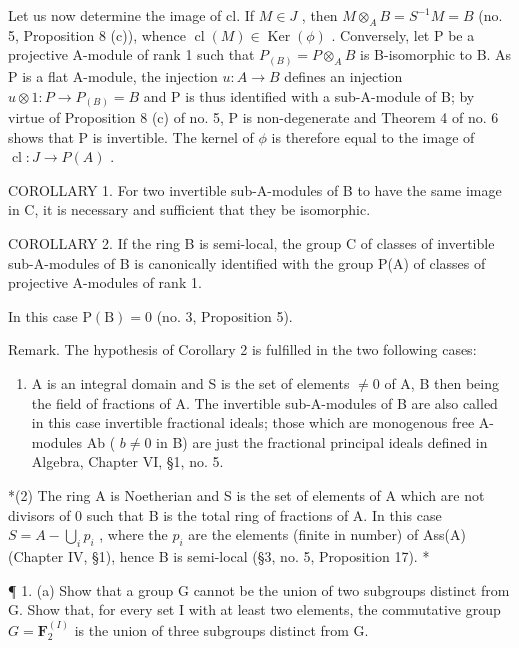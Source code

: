 Let us now determine the image of cl. If \(M \in J\) , then \(M \otimes_{A} B = S^{-1}M = B\) (no. 5, Proposition 8 (c)), whence \(\operatorname{cl}(M) \in \operatorname{Ker}(\phi)\) . Conversely, let P be a projective A-module of rank 1 such that \(P_{(B)} = P \otimes_{A} B\) is B-isomorphic to B. As P is a flat A-module, the injection \(u: A \to B\) defines an injection \(u \otimes 1: P \to P_{(B)} = B\) and P is thus identified with a sub-A-module of B; by virtue of Proposition 8 (c) of no. 5, P is non-degenerate and Theorem 4 of no. 6 shows that P is invertible. The kernel of \(\phi\) is therefore equal to the image of \(\operatorname{cl}: J \to P(A)\) .

COROLLARY 1. For two invertible sub-A-modules of B to have the same image in C, it is necessary and sufficient that they be isomorphic.

COROLLARY 2. If the ring B is semi-local, the group C of classes of invertible sub-A-modules of B is canonically identified with the group P(A) of classes of projective A-modules of rank 1.

In this case \(\mathrm{P(B)} = 0\) (no. 3, Proposition 5).

Remark. The hypothesis of Corollary 2 is fulfilled in the two following cases:

\begin{enumerate}
\def\labelenumi{(\arabic{enumi})}
\tightlist
\item
  A is an integral domain and S is the set of elements \(\neq0\) of A, B then being the field of fractions of A. The invertible sub-A-modules of B are also called in this case invertible fractional ideals; those which are monogenous free A-modules Ab ( \(b\neq0\) in B) are just the fractional principal ideals defined in Algebra, Chapter VI, §1, no. 5.
\end{enumerate}

*(2) The ring A is Noetherian and S is the set of elements of A which are not divisors of 0 such that B is the total ring of fractions of A. In this case \(S = A - \bigcup_{i} p_i\) , where the \(p_i\) are the elements (finite in number) of Ass(A) (Chapter IV, §1), hence B is semi-local (§3, no. 5, Proposition 17). *



¶ 1. (a) Show that a group G cannot be the union of two subgroups distinct from G. Show that, for every set I with at least two elements, the commutative group \(G = \mathbf{F}_{2}^{(I)}\) is the union of three subgroups distinct from G.


